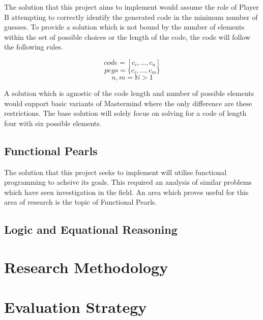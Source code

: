 \documentclass[12pt]{article}  %
\theoremstyle{definition}
\theoremstyle{remark}
\begin{document}
\par The solution that this project aims to implement would assume the role of Player B attempting to correctly identify the generated code in the minimum number of guesses.
To provide a solution which is not bound by the number of elements within the set of possible choices or the length of the code, the code will follow the following rules.

\[ code = [c_i, ... ,c_n]\]
\[pegs = \{c_i, ... , c_m\}\]
\[ n,m = \mathbb{N} > 1\]

A solution which is agnostic of the code length and number of possible elements would support basic variants of Mastermind where the only difference are these restrictions. The base solution will solely focus on solving for a code of length four with six possible elements.

\subsection {Functional Pearls}
The solution that this project seeks to implement will utilise functional programming to acheive its goals. This required an analysis of similar problems which have seen investigation in the field. An area which proves useful for this area of research is the topic of Functional Pearls.





\subsection {Logic and Equational Reasoning}


\newpage                     %
\section{Research Methodology}\label{ss:back}

\newpage                     %
\section{Evaluation Strategy}\label{ss:back}
\end{document}
